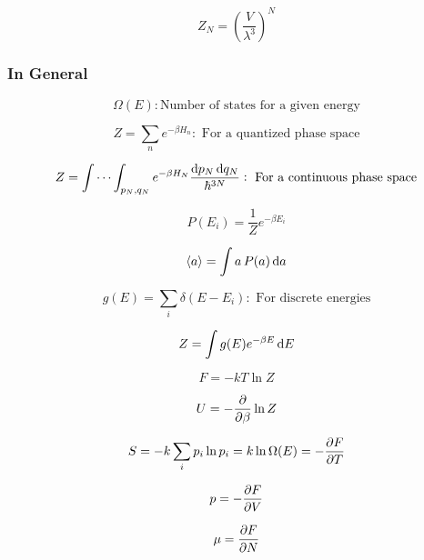 \documentclass{article}
\begin{document}
\begin{equation}
	Z_N=\left(\frac{V}{\lambda^3}\right)^N
\end{equation}
\subsubsection{In General}
\begin{equation}
	\Omega(E): \text{Number of states for a given energy}
\end{equation}

\begin{equation}
	Z=\sum_n e^{-\beta H_n}: \text{   For a quantized phase space}
\end{equation}

\begin{equation}
	Z=\idotsint_{p_N, q_N} e^{-\beta H_N} \frac{\dif p_N \dif q_N}{\hbar^{3N}}: \text{   For a continuous phase space}
\end{equation}

\begin{equation}
	P(E_i)=\frac{1}{Z}e^{-\beta E_i}
\end{equation}

\begin{equation}
	\left\langle a \right\rangle=\int a \, P(a) \dif a
\end{equation}

\begin{equation}
	g(E)=\sum_i \delta(E-E_i): \text{   For discrete energies}
\end{equation}

\begin{equation}
	Z=\int g(E)e^{-\beta E}\dif E
\end{equation}

\begin{equation}
	F=-kT\ln Z
\end{equation}

\begin{equation}
	U=-\pdv{\beta}\ln Z
\end{equation}

\begin{equation}
	S=-k\sum_i p_i \ln p_i=k\ln\Omega(E)=-\pdv{F}{T}
\end{equation}

\begin{equation}
	p=-\pdv{F}{V}
\end{equation}

\begin{equation}
	\mu=\pdv{F}{N}
\end{equation}
\end{document}
